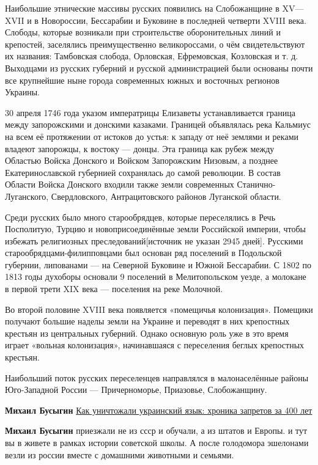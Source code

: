 \begin{itemize}
{\begin{itemize}
Наибольшие этнические массивы русских появились на Слобожанщине в XV—XVII и в
Новороссии, Бессарабии и Буковине в последней четверти XVIII века. Слободы,
которые возникали при строительстве оборонительных линий и крепостей,
заселялись преимущественно великороссами, о чём свидетельствуют их названия:
Тамбовская слобода, Орловская, Ефремовская, Козловская и т. д. Выходцами из
русских губерний и русской администрацией были основаны почти все крупнейшие
ныне города современных южных и восточных регионов Украины.

30 апреля 1746 года указом императрицы Елизаветы устанавливается граница между
запорожскими и донскими казаками. Границей объявлялась река Кальмиус на всем её
протяжении от истоков до устья: к западу от неё землями и реками владеют
запорожцы, к востоку — донцы. Эта граница как рубеж между Областью Войска
Донского и Войском Запорожским Низовым, а позднее Екатеринославской губернией
сохранялась до самой революции. В состав Области Войска Донского входили также
земли современных Станично-Луганского, Свердловского, Антрацитовского районов
Луганской области.

Среди русских было много старообрядцев, которые переселялись в Речь Посполитую,
Турцию и новоприсоединённые земли Российской империи, чтобы избежать
религиозных преследований[источник не указан 2945 дней]. Русскими
старообрядцами-филипповцами был основан ряд поселений в Подольской губернии,
липованами — на Северной Буковине и Южной Бессарабии. С 1802 по 1813 годы
духоборы основали 9 поселений в Мелитопольском уезде, а молокане в первой трети
XIX века — поселения на реке Молочной.

Во второй половине XVIII века появляется «помещичья колонизация». Помещики
получают большие наделы земли на Украине и переводят в них крепостных крестьян
из центральных губерний. Однако основную роль уже в это время играет «вольная
колонизация», начинавшаяся с переселения беглых крепостных крестьян.

Наибольший поток русских переселенцев направлялся в малонаселённые районы
Юго-Западной России — Причерноморье, Приазовье, Слобожанщину.

\textbf{Михаил Бусыгин}
\href{https://argumentua.com/stati/kak-unichtozhali-ukrainskii-yazyk-khronika-zapretov-za-400-let}%
{Как уничтожали украинский язык: хроника запретов за 400 лет}

\textbf{Михаил Бусыгин} приезжали не из ссср и обучали, а из штатов и Европы. и тут вы в
живете в рамках истории советской школы. А после голодомора эшелонами везли из
россии вместе с домашними животными и семьями.


\end{itemize}}
\end{itemize}
